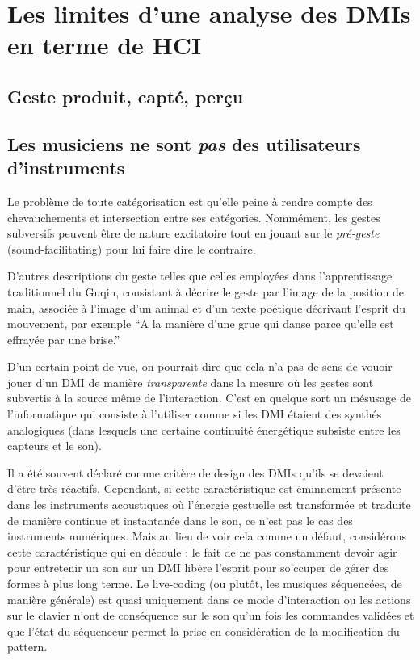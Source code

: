 \section{Les limites d'une analyse des DMIs en terme de HCI}
\label{sec:gesture:limitesHCI}

\subsection{Geste produit, capté, perçu}

\subsection{Les musiciens ne sont \emph{pas} des utilisateurs d'instruments}

Le problème de toute catégorisation est qu'elle peine à rendre compte des chevauchements et intersection entre ses catégories. Nommément, les gestes subversifs peuvent être de nature excitatoire tout en jouant sur le \textit{pré-geste} (sound-facilitating) pour lui faire dire le contraire.

D'autres descriptions du geste telles que celles employées dans l'apprentissage traditionnel du Guqin, consistant à décrire le geste par l'image de la position de main, associée à l'image d'un animal et d'un texte poétique décrivant l'esprit du mouvement, par exemple ``A la manière d'une grue qui danse parce qu'elle est effrayée par une brise.''

D'un certain point de vue, on pourrait dire que cela n'a pas de sens de vouoir jouer d'un DMI de manière \textit{transparente} dans la mesure où les gestes sont subvertis à la source même de l'interaction. C'est en quelque sort un mésusage de l'informatique qui consiste à l'utiliser comme si les DMI étaient des synthés analogiques (dans lesquels une certaine continuité énergétique subsiste entre les capteurs et le son).


Il a été souvent déclaré comme critère de design des DMIs qu'ils se devaient d'être très réactifs. Cependant, si cette caractéristique est éminnement présente dans les instruments acoustiques où l'énergie gestuelle est transformée et traduite de manière continue et instantanée dans le son, ce n'est pas le cas des instruments numériques. Mais au lieu de voir cela comme un défaut, considérons cette caractéristique qui en découle : le fait de ne pas constamment devoir agir pour entretenir un son sur un DMI libère l'esprit pour so'ccuper de gérer des formes à plus long terme. Le live-coding (ou plutôt, les musiques séquencées, de manière générale) est quasi uniquement dans ce mode d'interaction ou les actions sur le clavier n'ont de conséquence sur le son qu'un fois les commandes validées et que l'état du séquenceur permet la prise en considération de la modification du pattern.

